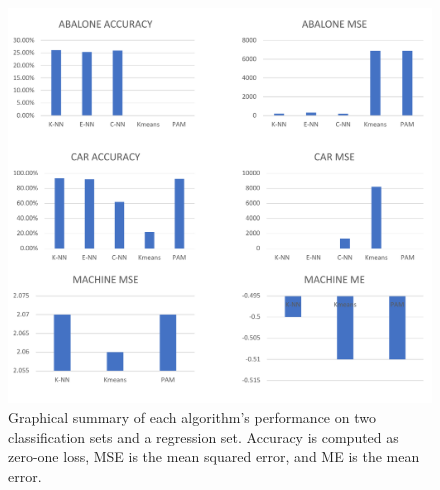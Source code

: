 \documentclass[twoside,11pt]{article}
\begin{document}
\begin{figure}[ht]
	\includegraphics[width=\linewidth]{comparisongraphs.pdf}
	\caption{Graphical summary of each algorithm's performance on two classification sets and a regression set. Accuracy is computed as zero-one loss, MSE is the mean squared error, and ME is the mean error.}
	\label{fig:comparealgs}
\end{figure}


\end{document}
